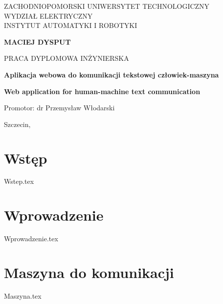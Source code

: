 \documentclass[12pt,a4paper,leqno,oneside,titlepage]{mwrep}
\begin{document}
\begin{titlepage}
\begin{center}

{\large ZACHODNIOPOMORSKI UNIWERSYTET TECHNOLOGICZNY\\ WYDZIAŁ ELEKTRYCZNY\\ INSTYTUT AUTOMATYKI I ROBOTYKI\par}
\end{center}
\vspace{1.5cm plus 1fill}
\begin{center}
{\bf \Large MACIEJ DYSPUT\par}
\end{center}
\vspace{1.5cm plus 1mm minus 2mm}
\begin{center}
{\large PRACA DYPLOMOWA INŻYNIERSKA\par}
\end{center}
\vspace{1.5cm plus 1mm minus 2mm}
\begin{center}
{\huge\textbf{Aplikacja webowa do komunikacji tekstowej człowiek-maszyna}\par}
\vspace{1.5cm plus 1.5fill}
{\large\textbf{Web application for human-machine text communication}\par}
\vspace{1.5cm plus 1.5fill}
\begin{flushright}
{\large Promotor: dr Przemysław Włodarski}
\end{flushright}
\vspace{4cm plus .1fill}
{\large Szczecin,\par}
\end{center}
\end{titlepage}
\tableofcontents
\chapter{Wstęp}
{Wstep.tex}

\chapter{Wprowadzenie}
{Wprowadzenie.tex}

\chapter{Maszyna do komunikacji}
{Maszyna.tex}
\end{document}
